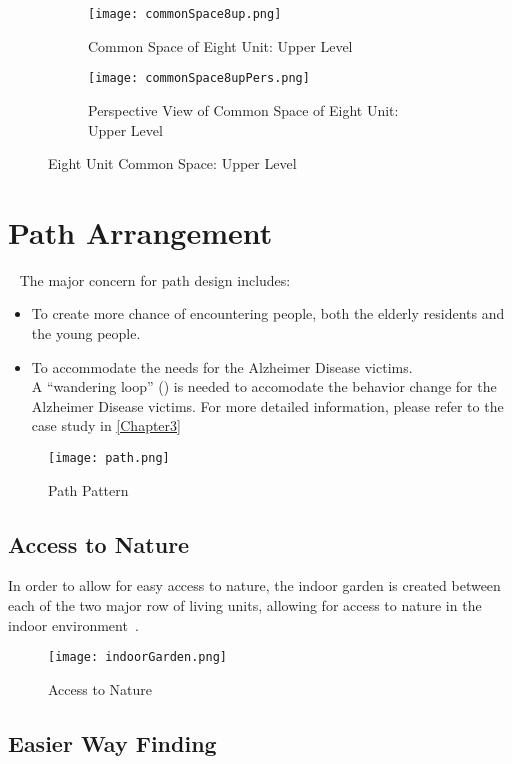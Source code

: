 \begin{figure}
\centering
\begin{subfigure}{\textwidth}
  \centering
  \texttt{[image: commonSpace8up.png]}
  \caption{Common Space of Eight Unit: Upper Level}
  \label{fig:commonSpace8}
\end{subfigure}
\begin{subfigure}{\textwidth}
  \centering
  \texttt{[image: commonSpace8upPers.png]}
  \caption{Perspective View of Common Space of Eight Unit: Upper Level}
  \label{fig:commonSpace8pers}
\end{subfigure}
\caption{Eight Unit Common Space: Upper Level}
\label{fig:eightUnitCommonSpaceUp}
\end{figure}

\newpage
\section{Path Arrangement}~
The major concern for path design includes:
\begin{itemize}
\item To create more chance of encountering people, both the elderly residents and the young people.
\item To accommodate the needs for the Alzheimer Disease victims. \\A ``wandering loop'' () is needed to accomodate the behavior change for the Alzheimer Disease victims. For more detailed information, please refer to the case study in \cref{Chapter3}
\end{itemize}

\begin{figure}[htbp]
	\centering
		\texttt{[image: path.png]}
	\caption[Path Pattern]{Path Pattern}
	\label{fig:path}
\end{figure}
\subsection{Access to Nature}
In order to allow for easy access to nature, the indoor garden is created between each of the two major row of living units, allowing for access to nature in the indoor environment~.
\begin{figure}[htbp]
	\centering
		\texttt{[image: indoorGarden.png]}
	\caption[Access to Nature]{Access to Nature}
	\label{fig:indoorGarden}
\end{figure}
\subsection{Easier Way Finding}
